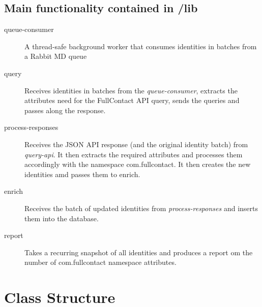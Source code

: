 \documentclass{article}
\begin{document}
\subsection{Main functionality contained in /lib}
\begin{description}
  \item[queue-consumer] A thread-safe background worker that consumes identities in batches from a Rabbit MD queue
  \item[query] Receives identities in batches from the \textit{queue-consumer}, extracts the attributes need for the FullContact API query, sends the queries and passes along the response.
  \item[process-responses] Receives the JSON API response (and the original identity batch) from \textit{query-api}. 
It then extracts the required attributes and processes them accordingly with the namespace com.fullcontact. It then creates the new identities amd passes them to enrich.
 \item[enrich] Receives the batch of updated identities from \textit{process-responses} and inserts them into the database.
 \item[report] Takes a recurring snapshot of all identities and produces a report om the number of com.fullcontact namespace attributes.
\end{description}

\section{Class Structure}
\end{document}
